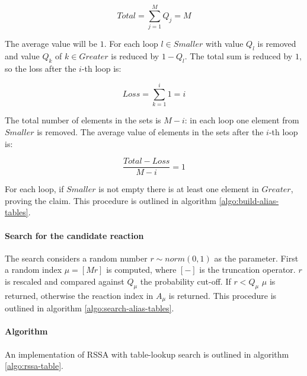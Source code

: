       $$Total = \sum\limits_{j=1}^MQ_j = M$$

      The average value will be $1$.
      For each loop $l\in Smaller$ with value $Q_l$ is removed and value $Q_k$ of $k\in Greater $ is reduced by $1-Q_l$.
      The total sum is reduced by $1$, so the loss after the $i$-th loop is:

      $$Loss = \sum\limits_{k=1}^i 1 = i$$

      The total number of elements in the sets is $M-i$: in each loop one element from $Smaller$ is removed.
      The average value of elements in the sets after the $i$-th loop is:

      $$\frac{Total-Loss}{M-i} = 1$$

      For each loop, if $Smaller$ is not empty there is at least one element in $Greater$, proving the claim.
      This procedure is outlined in algorithm \ref{algo:build-alias-tables}.

      

      \paragraph{Search for the candidate reaction}
      The search considers a random number $r\sim norm(0,1)$ as the parameter.
      First a random index $\mu = [Mr]$ is computed, where $[-]$ is the truncation operator.
      $r$ is rescaled and compared against $Q_\mu$ the probability cut-off.
      If $r< Q_\mu$ $\mu$ is returned, otherwise the reaction index in $A_\mu$ is returned.
      This procedure is outlined in algorithm \ref{algo:search-alias-tables}.

      

      \paragraph{Algorithm}
      An implementation of RSSA with table-lookup search is outlined in algorithm \ref{algo:rssa-table}.

      

